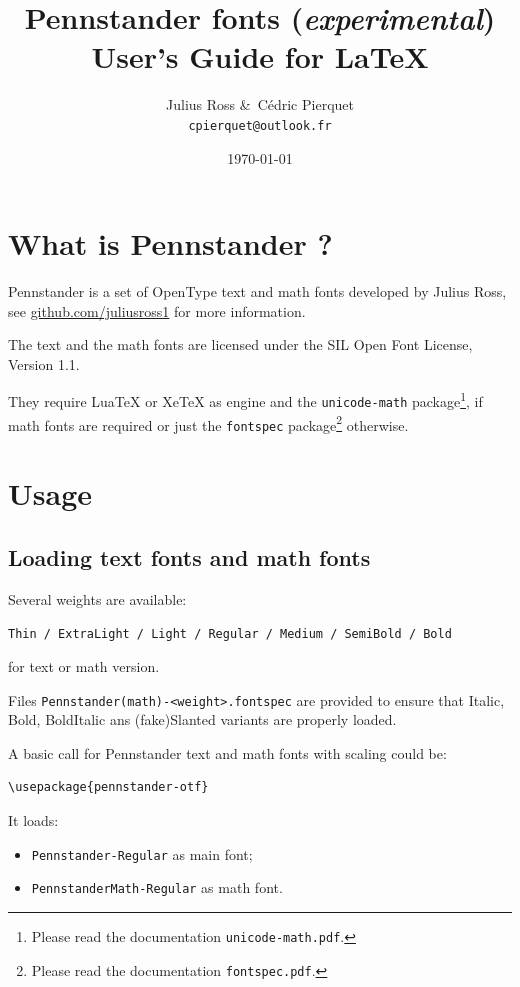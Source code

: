 \documentclass[a4paper]{scrartcl}
\title{Pennstander fonts (\textit{experimental}) \\User’s Guide for LaTeX}
\author{Julius Ross \&\ Cédric Pierquet \\ \texttt{cpierquet@outlook.fr}}
\date{\today}
\newcommand*{\pkg}[1]{\texttt{#1}}
\newcommand*{\file}[1]{\texttt{#1}}
\newcommand*{\opt}[1]{\texttt{#1}}
\begin{document}
\maketitle

\section{What is Pennstander ?}

Pennstander is a set of OpenType text and math fonts developed by Julius Ross, see \url{github.com/juliusross1} for more information.

The text and the math fonts are licensed under the SIL Open Font License, Version 1.1.

They require LuaTeX or XeTeX as engine and the \pkg{unicode-math} package\footnote{Please read the documentation \file{unicode-math.pdf}.}, if math fonts are required or just the \pkg{fontspec} package\footnote{Please read the documentation \file{fontspec.pdf}.} otherwise.

\section{Usage}

\subsection{Loading text fonts and math fonts}

Several weights are available:

\hfill\opt{Thin / ExtraLight / Light / Regular / Medium / SemiBold / Bold}\hfill\null

for text or math version.

\smallskip

Files \file{Pennstander(math)-<weight>.fontspec} are provided to ensure that Italic, Bold, BoldItalic ans (fake)Slanted variants are properly loaded.

\smallskip

A basic call for Pennstander text and math fonts with scaling could be:

\begin{verbatim}
\usepackage{pennstander-otf}
\end{verbatim}

It loads:

\begin{itemize}
	\item \opt{Pennstander-Regular} as main font;
	\item \opt{PennstanderMath-Regular} as math font.
\end{itemize}
\end{document}
